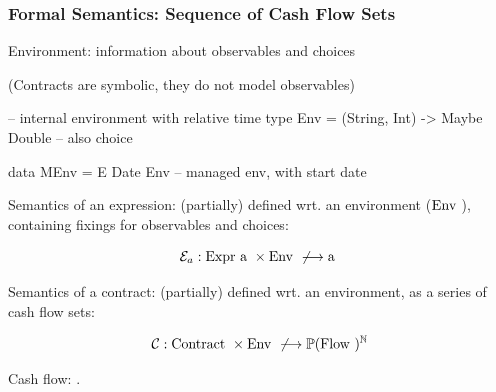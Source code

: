\documentclass[xcolor=dvipsnames,11pt]{beamer}
\renewcommand{\emph}[1]{\textcolor{structure!90}{#1}}
\newcommand{\ttt}[1]{\mbox{\cd{#1}~}}
\begin{document}
%
%
%
%
%
%
%
%
%

\newcommand{\crule}[3]{\frac{#2}{#3}\ \mbox{\scriptsize \it #1}}
\newcommand{\sem}[1]{[\![#1]\!]}
\newcommand{\csem}[3]{\mathcal{C}\sem{#1}#2 & = #3}

\begin{frame}[fragile,t]
    \frametitle{Formal Semantics: Sequence of Cash Flow Sets}

\emph{Environment}: information about observables and choices

 (Contracts are \emph{symbolic}, they do not model observables)
\begin{hscode}
-- internal environment with relative time
type Env = (String, Int) -> Maybe Double -- also choice

data MEnv = E Date Env -- managed env, with start date
\end{hscode}

\emph{Semantics of an expression}: (partially) defined 
wrt. an environment ($\ttt{Env}$), containing fixings for
observables and choices:


{\footnotesize
$$
  \mathcal{E}_a : \ttt{Expr a} \times \ttt{Env} \not\longrightarrow \ttt{a}
$$}
\vspace*{-2ex}

\emph{Semantics of a contract}: (partially) defined wrt.
an environment, as a series of cash flow sets:

$$ \mathcal{C} : \ttt{Contract} \times \ttt{Env} 
          \not\longrightarrow \mathbb{P}(\ttt{Flow})^\mathbb{N}$$
\vspace*{-2ex}

\emph{Cash flow}: .

\end{frame}
\end{document}
